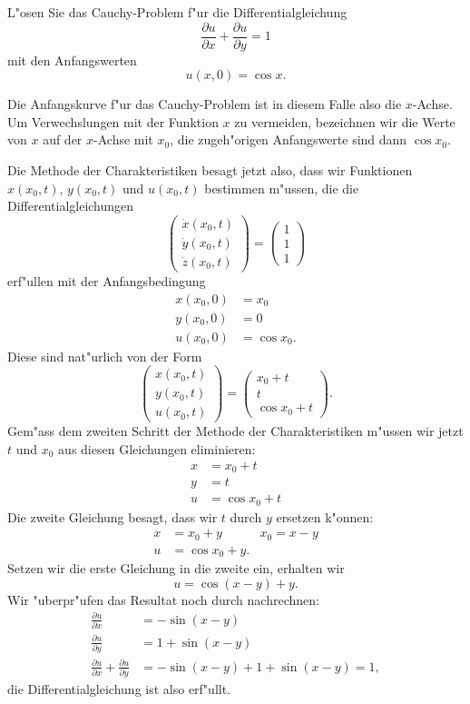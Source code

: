 L"osen Sie das Cauchy-Problem f"ur die Differentialgleichung
\[
\frac{\partial u}{\partial x}
+
\frac{\partial u}{\partial y}
=1
\]
mit den Anfangswerten
\[
u(x,0)=\cos x.
\]

\begin{loesung}
Die Anfangskurve f"ur das Cauchy-Problem ist in diesem Falle also die
$x$-Achse. Um Verwechslungen mit der Funktion $x$ zu vermeiden, bezeichnen
wir die Werte von $x$ auf der $x$-Achse mit $x_0$, die zugeh"origen
Anfangswerte sind dann $\cos x_0$. 

Die Methode der Charakteristiken besagt jetzt also, dass wir Funktionen
$x(x_0, t)$, $y(x_0,t)$ und $u(x_0,t)$ bestimmen m"ussen, die die
Differentialgleichungen
\[
\begin{pmatrix}
\dot x(x_0,t)\\
\dot y(x_0,t)\\
\dot z(x_0,t)
\end{pmatrix}
=\begin{pmatrix}
1\\1\\1
\end{pmatrix}
\]
erf"ullen mit der Anfangsbedingung
\begin{align*}
x(x_0,0)&=x_0\\
y(x_0,0)&=0\\
u(x_0,0)&=\cos x_0.
\end{align*}
Diese sind nat"urlich von der Form
\[
\begin{pmatrix}
x(x_0,t)\\
y(x_0,t)\\
u(x_0,t)
\end{pmatrix}
=
\begin{pmatrix}
x_0+t\\
t\\
\cos x_0 + t
\end{pmatrix}.
\]
Gem"ass dem zweiten Schritt der Methode der Charakteristiken m"ussen
wir jetzt $t$ und $x_0$ aus diesen Gleichungen eliminieren:
\begin{align*}
x&=x_0+t\\
y&=t\\
u&=\cos x_0 + t
\end{align*}
Die zweite Gleichung besagt, dass wir $t$ durch $y$ ersetzen k"onnen:
\begin{align*}
x&=x_0+y&x_0=x-y\\
u&=\cos x_0 + y.
\end{align*}
Setzen wir die erste Gleichung in die zweite ein, erhalten wir
\[
u=\cos(x-y)+y.
\]
Wir "uberpr"ufen das Resultat noch durch nachrechnen:
\begin{align*}
\frac{\partial u}{\partial x}
&=
-\sin(x-y)
\\
\frac{\partial u}{\partial y}
&=
1+\sin(x-y)
\\
\frac{\partial u}{\partial x}
+
\frac{\partial u}{\partial y}
&=
-\sin(x-y)
+
1+\sin(x-y)
=1,
\end{align*}
die Differentialgleichung ist also erf"ullt.
\end{loesung}

